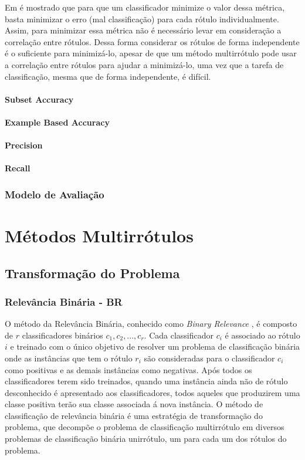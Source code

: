 Em \cite{pcc2010} é mostrado que para que um classificador minimize o valor dessa métrica, basta minimizar
o erro (mal classificação) para cada rótulo individualmente. 
Assim, para minimizar essa métrica não é necessário levar
em consideração a correlação entre rótulos. Dessa forma considerar os rótulos de forma independente é o suficiente para minimizá-lo,
apesar de que um método multirrótulo pode usar a correlação entre rótulos para ajudar a minimizá-lo, uma vez que 
a tarefa de classificação, mesma que de forma independente, é difícil.

\subsubsection{Subset Accuracy}
\subsubsection{Example Based Accuracy}
\subsubsection{Precision}
\subsubsection{Recall}
\subsection{Modelo de Avaliação}
\label{sec:modelav}


\chapter{Métodos Multirrótulos}
\section{Transformação do Problema}
\subsection{Relevância Binária - BR}
\label{sec:br}


O método da Relevância Binária, conhecido como \textit{Binary Relevance} \cite{br2010}, 
é composto de $r$ classificadores binários $c_1,c_2,...,c_r$. Cada classificador $c_i$ 
é associado ao rótulo $i$ e treinado com o único objetivo de resolver
um problema de classificação binária onde as instâncias que
tem o rótulo $r_i$ são consideradas para o classificador $c_i$ como positivas
e as demais instâncias como
negativas. 
Após todos os classificadores terem sido treinados, quando uma instância
ainda não de rótulo desconhecido 
é apresentado aos classificadores, todos aqueles que produzirem uma classe positiva
terão sua classe associada á nova instância.
O método de classificação de relevância binária é uma estratégia de transformação do
problema, que decompõe o problema de classificação multirrótulo em diversos problemas
de classificação binária unirrótulo, um para cada um dos rótulos do problema.

